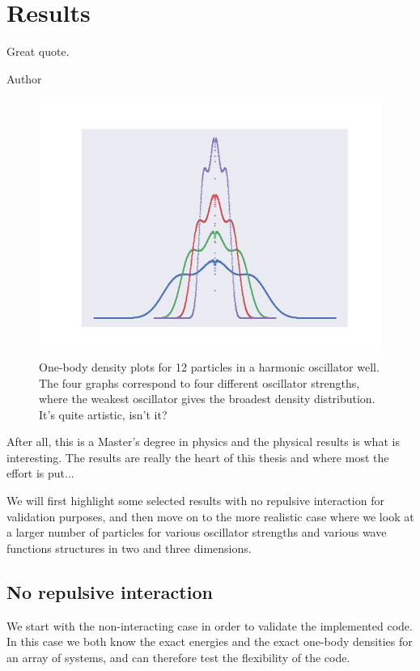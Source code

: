 \chapter{Results} \label{sec:results}
\epigraph{Great quote.}{Author}
\begin{figure}[H]
	\centering
	\includegraphics[scale=0.8]{Images/art.png}
	\caption{One-body density plots for 12 particles in a harmonic oscillator well. The four graphs correspond to four different oscillator strengths, where the weakest oscillator gives the broadest density distribution. It's quite artistic, isn't it?}
\end{figure}
After all, this is a Master's degree in physics and the physical results is what is interesting. 
The results are really the heart of this thesis and where most the effort is put... 

We will first highlight some selected results with no repulsive interaction for validation purposes, and then move on to the more realistic case where we look at a larger number of particles for various oscillator strengths and various wave functions structures in two and three dimensions.  

\newpage
\section{No repulsive interaction}
We start with the non-interacting case in order to validate the implemented code. In this case we both know the exact energies and the exact one-body densities for an array of systems, and can therefore test the flexibility of the code. 

